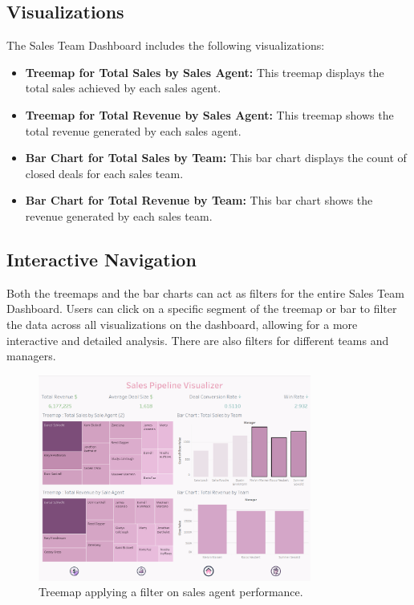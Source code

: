 \documentclass{article}
\begin{document}
\subsection{Visualizations}
The Sales Team Dashboard includes the following visualizations:
\begin{itemize}
    \item \textbf{Treemap for Total Sales by Sales Agent:} This treemap displays the total sales achieved by each sales agent.
    \item \textbf{Treemap for Total Revenue by Sales Agent:} This treemap shows the total revenue generated by each sales agent.
    \item \textbf{Bar Chart for Total Sales by Team:} This bar chart displays the count of closed deals for each sales team.
    \item \textbf{Bar Chart for Total Revenue by Team:} This bar chart shows the revenue generated by each sales team.
\end{itemize}

\subsection{Interactive Navigation}
Both the treemaps and the bar charts can act as filters for the entire Sales Team Dashboard. Users can click on a specific segment of the treemap or bar to filter the data across all visualizations on the dashboard, allowing for a more interactive and detailed analysis. There are also filters for different teams and managers.

\begin{figure}[h!]
    \centering
    \includegraphics[width=0.8\textwidth]{resources/swappy-20240527_160904.png}
    \caption{Treemap applying a filter on sales agent performance.}
    \label{fig:sales_agent_treemap_filter}
\end{figure}
\end{document}
